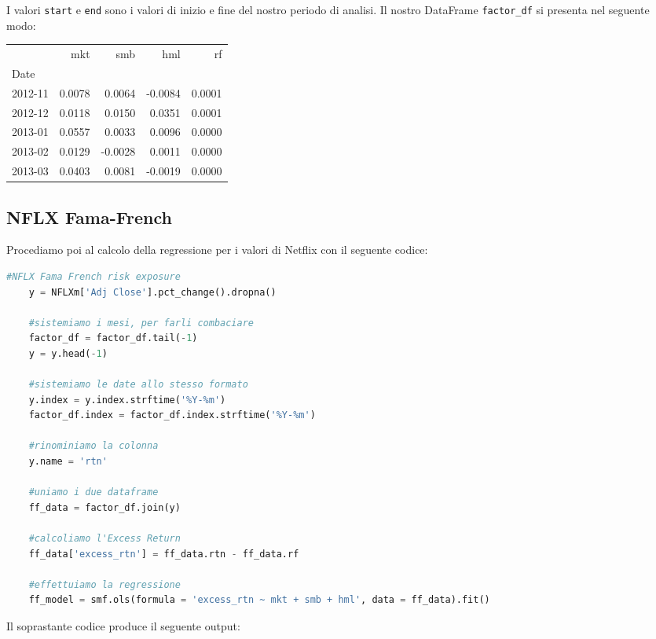 \documentclass{report}
\begin{document}
I valori \lstinline{start} e \lstinline{end} sono i valori di inizio e fine del nostro periodo di analisi. Il nostro DataFrame \lstinline{factor_df} si presenta nel seguente modo:

\begin{tabular}{lrrrr}
\toprule
{} &     mkt &     smb &     hml &      rf \\
Date    &         &         &         &         \\
\midrule
2012-11 &  0.0078 &  0.0064 & -0.0084 &  0.0001 \\
2012-12 &  0.0118 &  0.0150 &  0.0351 &  0.0001 \\
2013-01 &  0.0557 &  0.0033 &  0.0096 &  0.0000 \\
2013-02 &  0.0129 & -0.0028 &  0.0011 &  0.0000 \\
2013-03 &  0.0403 &  0.0081 & -0.0019 &  0.0000 \\
\bottomrule
\end{tabular}

\subsection{NFLX Fama-French}
Procediamo poi al calcolo della regressione per i valori di Netflix con il seguente codice:

\begin{lstlisting}[language=python]
    #NFLX Fama French risk exposure
    y = NFLXm['Adj Close'].pct_change().dropna()
    
    #sistemiamo i mesi, per farli combaciare
    factor_df = factor_df.tail(-1)
    y = y.head(-1)
    
    #sistemiamo le date allo stesso formato
    y.index = y.index.strftime('%Y-%m')
    factor_df.index = factor_df.index.strftime('%Y-%m')
    
    #rinominiamo la colonna
    y.name = 'rtn'
    
    #uniamo i due dataframe
    ff_data = factor_df.join(y)
    
    #calcoliamo l'Excess Return
    ff_data['excess_rtn'] = ff_data.rtn - ff_data.rf
    
    #effettuiamo la regressione
    ff_model = smf.ols(formula = 'excess_rtn ~ mkt + smb + hml', data = ff_data).fit()
\end{lstlisting}
Il soprastante codice produce il seguente output:
\end{document}
